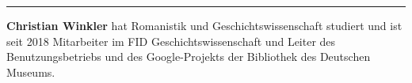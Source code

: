 \begin{center}\rule{0.5\linewidth}{0.5pt}\end{center}

\textbf{Christian Winkler} hat Romanistik und Geschichtswissenschaft
studiert und ist seit 2018 Mitarbeiter im FID Geschichtswissenschaft und
Leiter des Benutzungsbetriebs und des Google-Projekts der Bibliothek des
Deutschen Museums.
